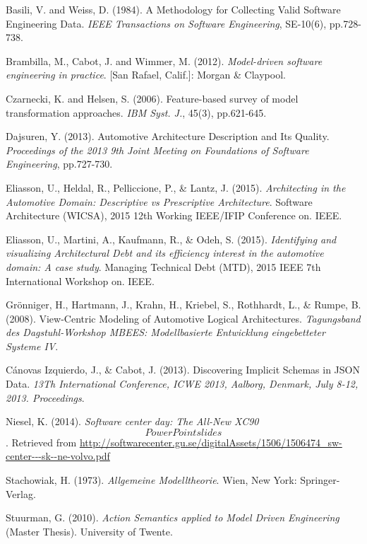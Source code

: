 \begin{thebibliography}{69}

Basili, V. and Weiss, D. (1984). A Methodology for Collecting Valid Software Engineering Data. \textit{IEEE Transactions on Software Engineering}, SE-10(6), pp.728-738.

Brambilla, M., Cabot, J. and Wimmer, M. (2012). \textit{Model-driven software engineering in practice}. [San Rafael, Calif.]: Morgan \& Claypool.

Czarnecki, K. and Helsen, S. (2006). Feature-based survey of model transformation approaches. \textit{IBM Syst. J.}, 45(3), pp.621-645.

Dajsuren, Y. (2013). Automotive Architecture Description and Its Quality. \textit{Proceedings of the 2013 9th Joint Meeting on Foundations of Software Engineering}, pp.727-730. 

Eliasson, U., Heldal, R., Pelliccione, P., \& Lantz, J. (2015). \textit{Architecting in the Automotive Domain: Descriptive vs Prescriptive Architecture}. Software Architecture (WICSA), 2015 12th Working IEEE/IFIP Conference on. IEEE.

Eliasson, U., Martini, A., Kaufmann, R., \& Odeh, S. (2015). \textit{Identifying and visualizing Architectural Debt and its efficiency interest in the automotive domain: A case study}. Managing Technical Debt (MTD), 2015 IEEE 7th International Workshop on. IEEE.

Grönniger, H., Hartmann, J., Krahn, H., Kriebel, S., Rothhardt, L., \& Rumpe, B. (2008). View-Centric Modeling of Automotive Logical Architectures. \textit{Tagungsband des Dagstuhl-Workshop MBEES: Modellbasierte Entwicklung eingebetteter Systeme IV}.

Cánovas Izquierdo, J., \& Cabot, J. (2013). Discovering Implicit Schemas in JSON Data. \textit{13Th International Conference, ICWE 2013, Aalborg, Denmark, July 8-12, 2013. Proceedings}.

Niesel, K. (2014). \textit{Software center day: The All-New XC90} \[PowerPoint slides\]. Retrieved from \url{http://softwarecenter.gu.se/digitalAssets/1506/1506474_sw-center---sk--ne-volvo.pdf}

Stachowiak, H. (1973). \textit{Allgemeine Modelltheorie}. Wien, New York: Springer-Verlag.

Stuurman, G. (2010). \textit{Action Semantics applied to Model Driven Engineering} (Master Thesis). University of Twente.


\end{thebibliography}
